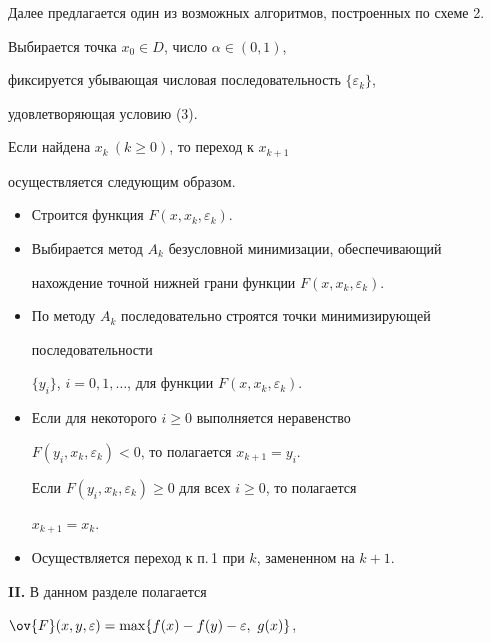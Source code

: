 Далее предлагается один из возможных алгоритмов, построенных по схеме 2.





\begin{alg}


Выбирается точка $x_0\in D$, число $\alpha\in (0,1)$,


фиксируется убывающая числовая последовательность $\{\varepsilon_k\}$,


удовлетворяющая условию (3).


 


Если найдена $x_k~(k\geq0)$, то переход к $x_{k+1}$


осуществляется следующим образом.


\begin{itemize}


\item[1.] Строится функция $F(x,x_k,\varepsilon_k)$.


\item[2.] Выбирается метод $A_k$ безусловной минимизации, обеспечивающий


нахождение точной нижней грани функции $F(x,x_k,\varepsilon_k)$.


\item[3.] По методу $A_k$ последовательно строятся точки минимизирующей


последовательности


$\{y_i\}$, $i=0,1,\dotsc$, для функции $F(x,x_k,\varepsilon_k)$.


\item[4.] Если для некоторого $i\ge0$ выполняется неравенство


$F(y_i,x_k,\varepsilon_k)<0$, то полагается $x_{k+1}=y_i$.


Если $F(y_i,x_k,\varepsilon_k)\ge0$ для всех $i\ge0$, то полагается


$x_{k+1}=x_k$.


\item[5.] Осуществляется переход к п.\,1 при $k$, замененном на $k+1$.


\end{itemize}


\end{alg}





{\bf II.} В данном разделе полагается


$\ov{F}(x,y,\varepsilon)=\max\{f(x)-f(y)-\varepsilon,\ g(x)\}$,


